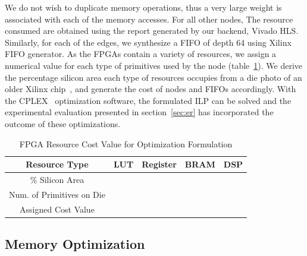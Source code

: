 We do not wish to duplicate memory operations, thus a very large weight
is associated with each of the memory accesses. For all other nodes,
The resource consumed are obtained using the report generated
by our backend, Vivado HLS. 
Similarly, for each of the edges, we synthesize a FIFO of depth 64 using Xilinx FIFO generator. 
As the FPGAs contain a variety of resources,
we assign a numerical value for each type of primitives used by the node (table~\ref{tab:resourcecost}). We derive the percentage silicon area
each type of resources occupies from a die photo of an older Xilinx chip~\cite{},
and generate the cost of nodes and FIFOs accordingly. 
With the CPLEX~\cite{iILO06a} optimization software, the formulated ILP can be solved and the experimental evaluation presented in section~\ref{sec:er} has incorporated the outcome of these optimizations.

\begin{table}[htbp]
\caption{FPGA Resource Cost Value for Optimization Formulation}
\centering
\begin{tabular}{| c | c | c | c | c | }
  \hline            
 \cline{3-5} 
  Resource Type     & LUT& Register & BRAM & DSP    \\
  \hline    
  \cline{3-5}
  \% Silicon Area & & & &\\
  \hline     
  \cline{3-5}
  Num. of Primitives on Die & & & &\\
  \hline     
  
  Assigned Cost Value & & & & \\
\hline                                                                                                           

\end{tabular}
\label{tab:resourcecost}

\end{table}





\subsection{Memory Optimization}
\label{sec:optmem}
